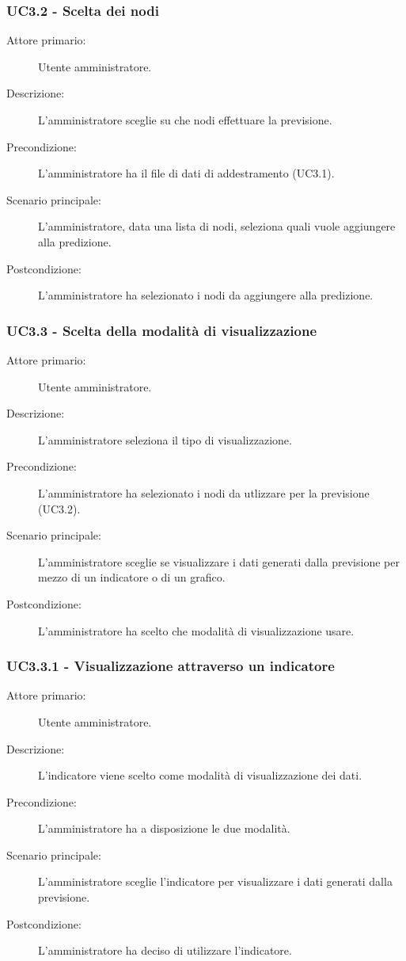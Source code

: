 \subsubsection{UC3.2 - Scelta dei nodi}
\label{sssec:uc3.2}
\begin{description}
  \item[Attore primario:] Utente amministratore.
  \item[Descrizione:] L'amministratore sceglie su che nodi effettuare la previsione.
  \item[Precondizione:] L'amministratore ha il file di dati di addestramento (UC3.1).
  \item[Scenario principale:] L'amministratore, data una lista di nodi, seleziona quali vuole aggiungere alla predizione.
  \item[Postcondizione:] L'amministratore ha selezionato i nodi da aggiungere alla predizione.
\end{description}

\subsubsection{UC3.3 - Scelta della modalità di visualizzazione}
\label{sssec:uc3.3}
\begin{description}
  \item[Attore primario:] Utente amministratore.
  \item[Descrizione:] L'amministratore seleziona il tipo di visualizzazione.
  \item[Precondizione:]  L'amministratore ha selezionato i nodi da utlizzare per la previsione (UC3.2).
  \item[Scenario principale:] L'amministratore sceglie se visualizzare i dati generati dalla previsione per mezzo di un indicatore o di un grafico.
  \item[Postcondizione:] L'amministratore ha scelto che modalità di visualizzazione usare.
\end{description}

\subsubsection{UC3.3.1 - Visualizzazione attraverso un indicatore}
\label{sssec:uc3.3.1}
\begin{description}
  \item[Attore primario:] Utente amministratore.
  \item[Descrizione:] L'indicatore viene scelto come modalità di visualizzazione dei dati.
  \item[Precondizione:] L'amministratore ha a disposizione le due modalità.
  \item[Scenario principale:] L'amministratore sceglie l'indicatore per visualizzare i dati generati dalla previsione.
  \item[Postcondizione:] L'amministratore ha deciso di utilizzare l'indicatore.
\end{description}

